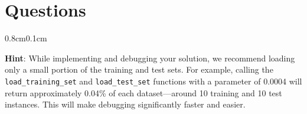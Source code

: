 \documentclass{article}
\begin{document}

\newpage
\section{Questions}
    
\vspace{0.5cm}
\begin{adjustwidth}{0.8cm}{0.1cm}
\begin{mybox}[boxblue] 
\textbf{Hint}: While implementing and debugging your solution, we recommend loading only a small portion of the training and test sets. For example, calling the \texttt{load\_training\_set} and \texttt{load\_test\_set} functions with a parameter of 0.0004 will return approximately 0.04\% of each dataset—around 10 training and 10 test instances. This will make debugging significantly faster and easier.
\end{mybox}
\end{adjustwidth}
\vspace{0.4cm}
\end{document}
